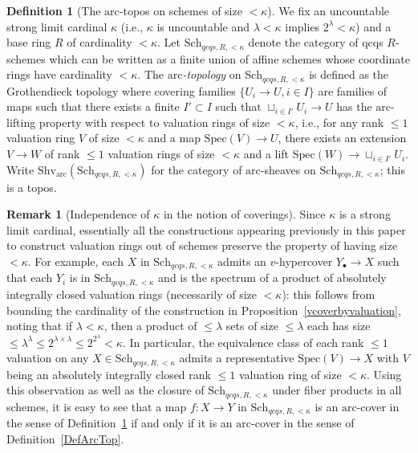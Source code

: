 \documentclass[reqno]{amsart}
\newcommand{\arc}{\mathrm{arc}}
\theoremstyle{definition}
\newtheorem{definition}[theorem]{Definition}
\newtheorem{remark}[theorem]{Remark}
\begin{document}
\begin{definition}[The $\arc$-topos on schemes of size $<\kappa$]
\label{ArcCovKappa}
We fix an uncountable strong limit cardinal $\kappa$ (i.e., $\kappa$ is
uncountable and $\lambda < \kappa$ implies $2^\lambda < \kappa$) and a base
ring $R$ of cardinality $< \kappa$. Let $\mathrm{Sch}_{qcqs, R, < \kappa}$
denote the category of qcqs $R$-schemes
which can be written as a finite union of affine schemes whose coordinate rings
have cardinality $< \kappa$. The {\em $\arc$-topology} on $\mathrm{Sch}_{qcqs,
R,  < \kappa}$ is defined as the
Grothendieck topology where covering families $\{U_i \to U, i \in I\}$ are 
families of maps such that there exists a 
finite $I' \subset I$ such that
$\sqcup_{i \in I'} U_i \to U$ has the $\arc$-lifting property with respect to
valuation rings of size $< \kappa$, i.e., for any rank $\leq 1$ valuation ring
$V$ of size $< \kappa$ and a map $\mathrm{Spec}(V) \to U$, there exists an
extension $V \to W$ of rank $\leq 1$ valuation rings of size $< \kappa$ and a
lift $\mathrm{Spec}(W) \to \sqcup_{i \in I'} U_i$. Write
$\mathrm{Shv}_{\arc}(\mathrm{Sch}_{qcqs,R, < \kappa})$ for the category of
$\arc$-sheaves on $\mathrm{Sch}_{qcqs,R, < \kappa}$; this is a topos.
\end{definition}

\begin{remark}[Independence of $\kappa$ in the notion of coverings]
\label{IndKappa}
Since $\kappa$ is a strong limit cardinal, essentially all the constructions
appearing previously in this paper to construct valuation rings out of schemes
preserve the property of having size $< \kappa$. For example, each $X$ in
$\mathrm{Sch}_{qcqs, R, < \kappa}$ admits an $v$-hypercover $Y_\bullet \to X$ such
that each $Y_i$ is in $\mathrm{Sch}_{qcqs,R, <\kappa}$ and is the spectrum of a
product of absolutely integrally closed valuation rings (necessarily of size $<
\kappa$): this follows from bounding the cardinality of the construction in
Proposition~\ref{vcoverbyvaluation}, noting that if $\lambda < \kappa$, then a
product of $\leq \lambda$  sets of size $\leq \lambda$ each has size $\leq
\lambda^\lambda \leq 2^{\lambda \times \lambda} \leq 2^{2^{\lambda}} < \kappa$.
In particular, the equivalence class of each rank $\leq 1$ valuation on any $X
\in \mathrm{Sch}_{qcqs, R, < \kappa}$ admits a representative $\mathrm{Spec}(V) \to
X$ with $V$ being an absolutely integrally closed rank $\leq 1$ valuation ring
of size $< \kappa$. Using this observation as well as the closure of
$\mathrm{Sch}_{qcqs, R, < \kappa}$ under fiber products in all schemes, it is
easy to see that a map $f\colon X \to Y$ in $\mathrm{Sch}_{qcqs, R, < \kappa}$ is an $\arc$-cover in the sense of Definition~\ref{ArcCovKappa} if and only if it is an $\arc$-cover in the sense of Definition~\ref{DefArcTop}.
 \end{remark}
\end{document}
